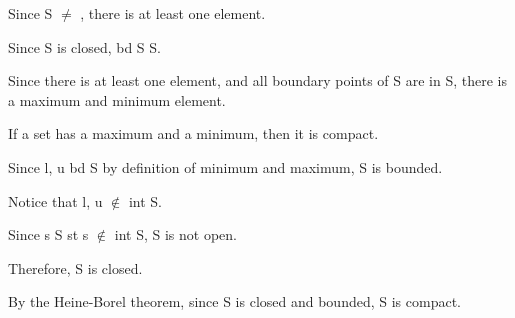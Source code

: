 \documentclass{article}
\begin{document}
{	Since S $\neq$ \es, there is at least one element.
	
	Since S is closed, bd S \sbs S.
	
	Since there is at least one element, and all boundary points of S are in S, there is a maximum and minimum element.
	
\item If a set has a maximum and a minimum, then it is compact.
	
	
	Since l, u \mem bd S by definition of minimum and maximum, S is bounded.
	
	Notice that l, u $\not\in$ int S.
	
	Since \exs s \mem S st s $\not\in$ int S, S is not open.
	
	Therefore, S is closed.
	
	By the Heine-Borel theorem, since S is closed and bounded, S is compact.
	
	
\elist

}
\end{document}
